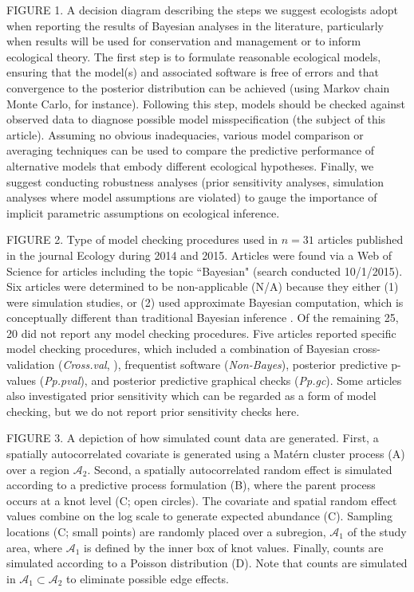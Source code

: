 \documentclass[12pt,english]{article}
\begin{document}
\begin{spacing}{1.9}
    FIGURE 1.  A decision diagram describing the steps we suggest
    ecologists adopt when reporting the results of Bayesian analyses
    in the literature, particularly when results will be used for
    conservation and management or to inform ecological theory.  The
    first step is to formulate reasonable ecological models, ensuring
    that the model(s) and associated software is free of errors and
    that convergence to the posterior distribution can be achieved
    (using Markov chain Monte Carlo, for instance).  Following this
    step, models should be checked against observed data to diagnose
    possible model misspecification (the subject of this article).
    Assuming no obvious inadequacies, various model comparison or
    averaging techniques can be used to compare the predictive
    performance of alternative models that embody different ecological
    hypotheses.  Finally, we suggest conducting robustness analyses
    (prior sensitivity analyses, simulation analyses where model
    assumptions are violated) to gauge the importance of implicit
    parametric assumptions on ecological inference.

    FIGURE 2.  Type of model checking procedures used in $n=31$
    articles published in the journal Ecology during 2014 and
    2015. Articles were found via a Web of Science for articles
    including the topic ``Bayesian" (search conducted 10/1/2015).  Six
    articles were determined to be non-applicable (N/A) because they
    either (1) were simulation studies, or (2) used approximate
    Bayesian computation, which is conceptually different than
    traditional Bayesian inference \citep[see
    e.g.][]{BeaumontEtAl2002}.  Of the remaining 25, 20 did not report
    any model checking procedures.  Five articles reported specific
    model checking procedures, which included a combination of
    Bayesian cross-validation (\textit{Cross.val}, ), frequentist
    software (\textit{Non-Bayes}), posterior predictive p-values
    (\textit{Pp.pval}), and posterior predictive graphical checks
    (\textit{Pp.gc}).  Some articles also investigated prior
    sensitivity which can be regarded as a form of model checking, but
    we do not report prior sensitivity checks here.

    FIGURE 3.  A depiction of how simulated count data are generated.
    First, a spatially autocorrelated covariate is generated using a
    Mat\'{e}rn cluster process (A) over a region $\mathcal{A}_2$.
    Second, a spatially autocorrelated random effect is simulated
    according to a predictive process formulation (B), where the
    parent process occurs at a knot level (C; open circles).  The
    covariate and spatial random effect values combine on the log
    scale to generate expected abundance (C).  Sampling locations (C;
    small points) are randomly placed over a subregion,
    $\mathcal{A}_1$ of the study area, where $\mathcal{A}_1$ is
    defined by the inner box of knot values. Finally, counts are
    simulated according to a Poisson distribution (D).  Note that
    counts are simulated in $\mathcal{A}_1 \subset \mathcal{A}_2$ to
    eliminate possible edge effects.


\end{spacing}
\end{document}
